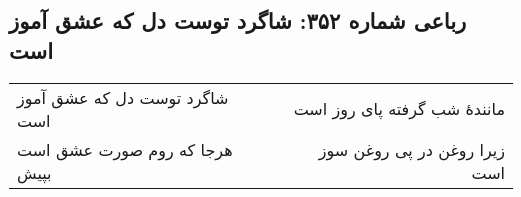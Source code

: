 \begin{center}
\section*{رباعی شماره ۳۵۲: شاگرد توست دل که عشق آموز است}
\label{sec:0352}
\begin{longtable}{l p{0.5cm} r}
شاگرد توست دل که عشق آموز است
&&
مانندهٔ شب گرفته پای روز است
\\
هرجا که روم صورت عشق است بپیش
&&
زیرا روغن در پی روغن سوز است
\\
\end{longtable}
\end{center}
